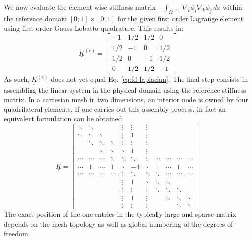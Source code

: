 \documentclass[sn-mathphys,Numbered]{sn-jnl}%
\theoremstyle{thmstyleone}%
\theoremstyle{thmstyletwo}%
\theoremstyle{thmstylethree}%
\begin{document}
We now evaluate the element-wise stiffness matrix $-\int_{\Omega^{(e)}} \nabla_k \phi_i \nabla_k \phi_j \,dx$ within the reference domain $\left[0;1\right]\times\left[0;1\right]$ for the given first order Lagrange element using first order Gauss-Lobatto quadrature. This results in:
\begin{equation}
    \underline{\underline{K}}^{(e)} = \begin{bmatrix}
         -1  & 1/2  & 1/2  & 0 \\
         1/2 &  -1  & 0    &  1/2 \\
         1/2 & 0    & -1   &  1/2 \\
        0    &  1/2 &  1/2 & -1
    \end{bmatrix}
\end{equation}
As such, $\underline{\underline{K}}^{(e)}$ does not yet equal Eq. \ref{eq:fd-laplacian}.
The final step consists in assembling the linear system in the physical domain using the reference stiffness matrix.
In a cartesian mesh in two dimensions, an interior node is owned by four quadrilateral elements.
If one carries out this assembly process, in fact an equivalent formulation can be obtained:
\begin{equation}
    \underline{\underline{K}} = \begin{bmatrix}
        \ddots & \ddots &  &  & \vdots & \vdots & \vdots &  &  &  &  \\
        \ddots & \ddots & \ddots &  & \vdots & 1 & \vdots &  &  &  &  \\
         & \ddots & \ddots & \ddots & \vdots & \vdots & \vdots &  &  &  &  \\
         &  & \ddots & \ddots & \ddots & 1 & \vdots &  &  &  &  \\
        \cdots & \cdots & \cdots & \ddots & \ddots & \ddots & \vdots & \cdots & \cdots & \cdots & \cdots \\
        \cdots & 1 & \cdots & 1 & \ddots & -4 & \ddots & 1 & \cdots & 1 & \cdots \\
        \cdots & \cdots & \cdots & \cdots & \vdots & \ddots & \ddots & \ddots & \cdots & \cdots & \cdots \\
         &  &  &  & \vdots & 1 & \ddots & \ddots & \ddots &  &  \\
         &  &  &  & \vdots & \vdots & \vdots & \ddots & \ddots & \ddots &  \\
         &  &  &  & \vdots & 1 & \vdots &  & \ddots & \ddots & \ddots \\
         &  &  &  & \vdots & \vdots & \vdots &  &  & \ddots & \ddots 
        \end{bmatrix}
\end{equation}
The exact position of the one entries in the typically large and sparse matrix depends on the mesh topology as well as global numbering of the degrees of freedom.
\end{document}
